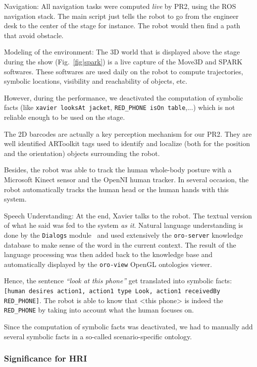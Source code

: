Navigation: All navigation tasks were computed \emph{live} by
PR2, using the ROS navigation stack. The main script just tells the robot to go
from the engineer desk to the center of the stage for instance. The robot would
then find a path that avoid obstacle.  

Modeling of the environment: The 3D world that is displayed above
the stage during the show (Fig.~\ref{fig|spark}) is a live capture of the
Move3D and SPARK softwares. These softwares are used daily on the robot to
compute trajectories, symbolic locations, visibility and reachability of
objects, etc.

However, during the performance, we deactivated the computation of symbolic
facts (like {\tt xavier looksAt jacket}, {\tt RED\_PHONE isOn table},...) which
is not reliable enough to be used on the stage.

The 2D barcodes are actually a key perception mechanism for our PR2. They are
well identified {\sc ARToolkit} tags used to identify and localize (both for the
position and the orientation) objects surrounding the robot.

Besides, the robot was able to track the human whole-body posture with a
Microsoft Kinect sensor and the {\sc OpenNI} human tracker. In several
occasion, the robot automatically tracks the human head or the human hands with
this system.

Speech Understanding: At the end, Xavier talks to the robot. The
textual version of what he said was fed to the system \emph{as it}. Natural
language understanding is done by the {\tt Dialogs}
module~\cite{Lemaignan2011a} and used extensively the {\tt oro-server} knowledge
database to make sense of the word in the current context. The result of the
language processing was then added back to the knowledge base and automatically
displayed by the {\tt oro-view} OpenGL ontologies viewer.

Hence, the sentence \emph{``look at this phone''} get translated into symbolic
facts: {\tt [human desires action1, action1 type Look, action1 receivedBy
RED\_PHONE]}. The robot is able to know that <this phone> is indeed the {\tt
RED\_PHONE} by taking into account what the human focuses on.

Since the computation of symbolic facts was deactivated, we had to manually add
several symbolic facts in a so-called scenario-specific ontology.

\subsubsection{Significance for HRI}

